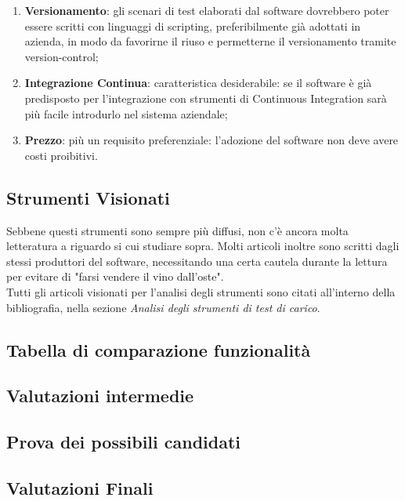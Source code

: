 \begin{enumerate}
	\item \textbf{Versionamento}: gli scenari di test elaborati dal software dovrebbero poter essere scritti con linguaggi di scripting, preferibilmente già adottati in azienda, in modo da favorirne il riuso e permetterne il versionamento tramite \gls{version-control};
	\item \textbf{Integrazione Continua}: caratteristica desiderabile: se il software è già predisposto per l'integrazione con strumenti di Continuous Integration sarà più facile introdurlo nel sistema aziendale;
	\item \textbf{Prezzo}: più un requisito preferenziale: l'adozione del software non deve avere costi proibitivi.
\end{enumerate}
\subsection{Strumenti Visionati}
Sebbene questi strumenti sono sempre più diffusi, non c'è ancora molta letteratura a riguardo si cui studiare sopra. Molti articoli inoltre sono scritti dagli stessi produttori del software, necessitando una certa cautela durante la lettura per evitare di "farsi vendere il vino dall'oste".\\
Tutti gli articoli visionati per l'analisi degli strumenti sono citati all'interno della bibliografia, nella sezione \textit{Analisi degli strumenti di test di carico}.


\subsection{Tabella di comparazione funzionalità}
\subsection{Valutazioni intermedie}
\subsection{Prova dei possibili candidati}
\subsection{Valutazioni Finali}
